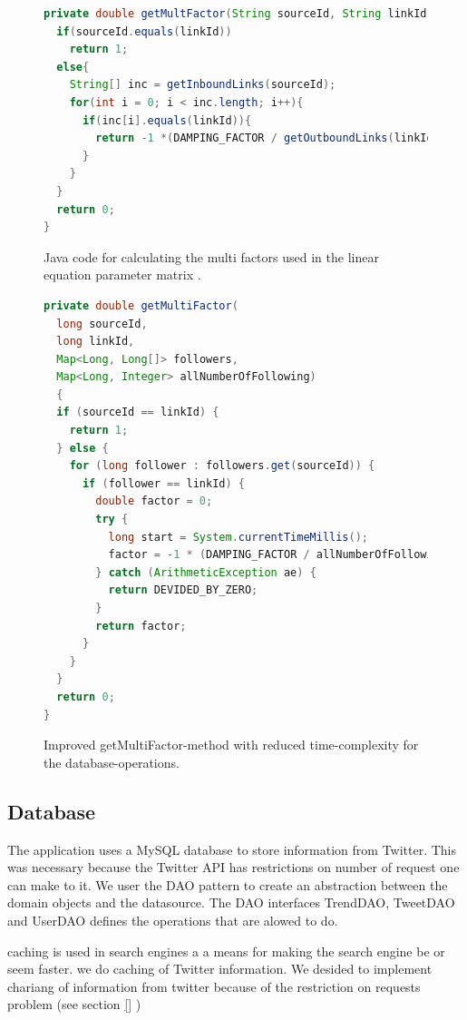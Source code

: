 \begin{figure}[h!]
\begin{lstlisting}[language=java]
private double getMultFactor(String sourceId, String linkId){ 
  if(sourceId.equals(linkId)) 
    return 1;
  else{
    String[] inc = getInboundLinks(sourceId); 
    for(int i = 0; i < inc.length; i++){ 
      if(inc[i].equals(linkId)){ 
        return -1 *(DAMPING_FACTOR / getOutboundLinks(linkId).length);
      } 
    }
  } 
  return 0;
}
\end{lstlisting}
\caption{Java code for calculating the multi factors used in the linear equation parameter matrix \protect \cite{Goodrarzi2009}.}
\label{fig:getmultifactor}
\end{figure}

\begin{figure}[h!]
\begin{lstlisting}[language=java]
private double getMultiFactor(
  long sourceId, 
  long linkId, 
  Map<Long, Long[]> followers, 
  Map<Long, Integer> allNumberOfFollowing) 
  {
  if (sourceId == linkId) {
    return 1;
  } else {
    for (long follower : followers.get(sourceId)) {
      if (follower == linkId) {
        double factor = 0;
        try {
          long start = System.currentTimeMillis();
          factor = -1 * (DAMPING_FACTOR / allNumberOfFollowing.get(linkId));
        } catch (ArithmeticException ae) {
          return DEVIDED_BY_ZERO;
        }
        return factor;
      }
    }
  }
  return 0;
}
\end{lstlisting}
\caption{Improved getMultiFactor-method with reduced time-complexity for the database-operations.}
\label{fig:getmultifactorimproved}
\end{figure}

\subsection{Database} %
\label{feedJamDatabase}
The application uses a MySQL database to store information from Twitter. This was necessary because the Twitter API has restrictions on number of request one can make to it.
We user the DAO pattern to create an abstraction between the domain objects and the datasource.  The DAO interfaces TrendDAO, TweetDAO and UserDAO defines the operations that are alowed to do.  


\citep{boka kap11} caching is used in search engines a a means for making the search engine be or seem faster. we do caching of Twitter information. We desided to implement chariang of information from twitter because of the restriction on requests problem (see section \ref{} \nameref{}) 

